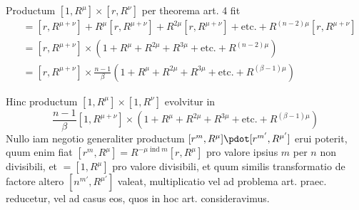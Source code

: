 Productum $[1,R^\mu]\times[r,R^\nu]$ per theorema art. 4 fit
\[
\begin{aligned}
&=[r,R^{\mu+\nu}]+R^\mu[r,R^{\mu+\nu}]+R^{2\mu}[r,R^{\mu+\nu}]+\text{etc.}+R^{(n-2)\mu}[r,R^{\mu+\nu}]\\
&=[r,R^{\mu+\nu}]\times(1+R^\mu+R^{2\mu}+R^{3\mu}+\text{etc.}+R^{(n-2)\mu})\\
&=[r,R^{\mu+\nu}]\times\frac{n-1}\beta(1+R^\mu+R^{2\mu}+R^{3\mu}+\text{etc.}+R^{(\beta-1)\mu})
\end{aligned}
\]

Hinc productum $[1,R^\mu]\times[1,R^\nu]$ evolvitur in
\[
\frac{n-1}\beta[1,R^{\mu+\nu}]\times(1+R^\mu+R^{2\mu}+R^{3\mu}+\text{etc.}+R^{(\beta-1)\mu})
\]
Nullo iam negotio generaliter productum $[r^m,R^\mu]\pdot[r^{m'},R^{\mu'}]$ erui poterit, quum enim fiat $[r^m,R^\mu]=R^{-\mu\operatorname{ind}m}[r,R^\mu]$ pro valore ipsius $m$ per $n$ non divisibili, et $=[1,R^\mu]$ pro valore divisibili, et quum similis transformatio de factore altero $[n^{m'},R^{\mu'}]$ valeat, multiplicatio vel ad problema art. praec. reducetur, vel ad casus eos, quos in hoc art. consideravimus.
